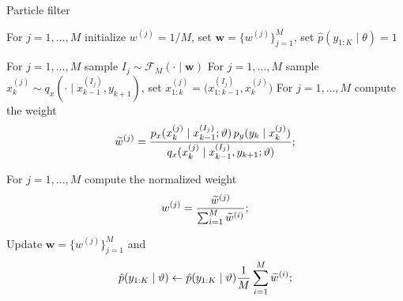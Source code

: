 \documentclass[10pt]{article}
\begin{document}
\begin{algorithm}[t]
	\caption{Particle filter}
	\label{alg:ParFil}
	For $j = 1, \ldots, M$ initialize $w^{(j)} = 1/M$, set $\mathbf w = \{w^{(j)}\}_{j=1}^M$, set $\hat p(y_{1:K} \mid \theta) = 1$\;
	 {
		For $j = 1, \ldots, M$ sample $I_j \sim \mathcal F_M(\cdot \mid \mathbf w)$ \;
		For $j = 1, \ldots, M$ sample $x_k^{(j)} \sim q_x(\cdot \mid x_{k-1}^{(I_j)}, y_{k+1})$, set $x^{(j)}_{1:k} = \big(x^{(I_j)}_{1:k-1}, x^{(j)}_k\big)$ \;
		For $j = 1, \ldots, M$ compute the weight 
		\begin{equation}\label{eq:WeightUpdate}
			\widetilde w^{(j)} = \frac{p_x(x_k^{(j)} \mid x_{k-1}^{(I_j)}; \vartheta) \, p_y(y_k \mid x_k^{(j)})}{q_x(x_k^{(j)} \mid x_{k-1}^{(I_j)}, y_{k+1}; \vartheta)};
		\end{equation}
	
		For $j = 1, \ldots, M$ compute the normalized weight $$w^{(j)} = \frac{\widetilde w^{(j)}}{\sum_{i=1}^{M}\widetilde w^{(i)}};$$
		
		Update $\mathbf w = \{w^{(j)}\}_{j=1}^M$ and $$\hat p(y_{1:K} \mid \vartheta) \leftarrow \hat p(y_{1:K} \mid \vartheta) \frac{1}{M} \sum_{i=1}^{M}\widetilde w^{(i)};$$
	}
\end{algorithm}
\end{document}

